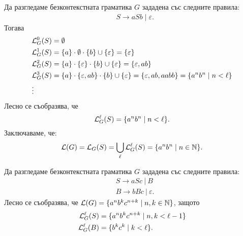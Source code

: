 \begin{example}
  Да разгледаме безконтекстната граматика $G$ зададена със следните правила:
  \begin{align*}
    & S \to aSb \mid \varepsilon.
  \end{align*}
  Тогава
  \begin{align*}
    & \mathcal{L}^0_G(S) = \emptyset\\
    & \mathcal{L}^1_G(S) = \{a\} \cdot \emptyset \cdot \{b\} \cup \{\varepsilon\} = \{\varepsilon\}\\
    & \mathcal{L}^{2}_G(S) = \{a\} \cdot \{\varepsilon\} \cdot \{b\} \cup \{\varepsilon\} = \{\varepsilon, ab\}\\
    & \mathcal{L}^{3}_G(S) = \{a\} \cdot \{\varepsilon, ab\} \cdot \{b\} \cup \{\varepsilon\} = \{\varepsilon,ab,aabb\} = \{a^nb^n \mid n < \ell\}\\
    & \vdots
  \end{align*}
  Лесно се съобразява, че
  \[\mathcal{L}^\ell_G(S) = \{a^nb^n \mid n < \ell\}.\]
  Заключаваме, че:
  \[\mathcal{L}(G) = \mathcal{L}_G(S) = \bigcup_{\ell}\mathcal{L}^\ell_G(S) = \{a^nb^n \mid n\in\mathbb{N}\}.\]
\end{example}

\begin{example}
  Да разгледаме безконтекстната граматика $G$ зададена със следните правила:
  \begin{align*}
    & S \to aSc\ |\  B\\
    & B \to bBc\ |\ \varepsilon.
  \end{align*}
  Лесно се съобразява, че $\mathcal{L}(G) = \{a^nb^kc^{n+k} \mid n,k\in\mathbb{N}\}$, защото
  \begin{align*}
    \mathcal{L}^\ell_G(S) & = \{a^nb^kc^{n+k} \mid n,k < \ell-1\}\\
    \mathcal{L}^\ell_G(B) & = \{b^kc^k \mid k < \ell\}.
  \end{align*}
\end{example}

